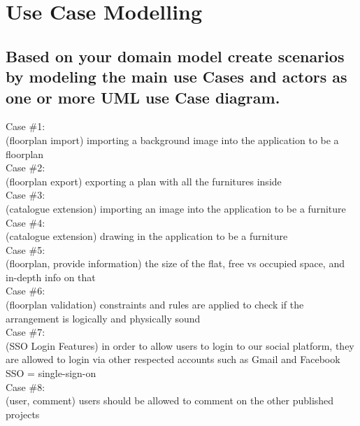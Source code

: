 \clearpage
\section{Use \noindent Case Modelling}
	
		\subsection{ Based on your domain model create scenarios by modeling the main use \noindent Cases
			and actors as one or more UML use \noindent Case diagram.}
		
			\noindent Case \#1:\\
			(floorplan import)
			importing a background image into the application to be a floorplan\\
			
			
			\noindent Case \#2:\\
			(floorplan export)
			exporting a plan with all the furnitures inside\\
			
			
			\noindent Case \#3:\\
			(catalogue extension)
			importing an image into the application to be a furniture\\
			
			
			\noindent Case \#4:\\
			(catalogue extension)
			drawing in the application to be a furniture\\
			
			
			\noindent Case \#5:\\
			(floorplan, provide information)
			the size of the flat, free vs occupied space, and in-depth info on that\\
			
			
			\noindent Case \#6:\\
			(floorplan validation)
			constraints and rules are applied to check if the arrangement is logically and physically sound\\
			
			
			\noindent Case \#7:\\
			(SSO Login Features)
			in order to allow users to login to our social platform, they are allowed to login via other respected accounts such as Gmail and Facebook\\
			SSO = single-sign-on\\
			
			\noindent Case \#8:\\
			(user, comment)
			users should be allowed to comment on the other published projects\\
			
